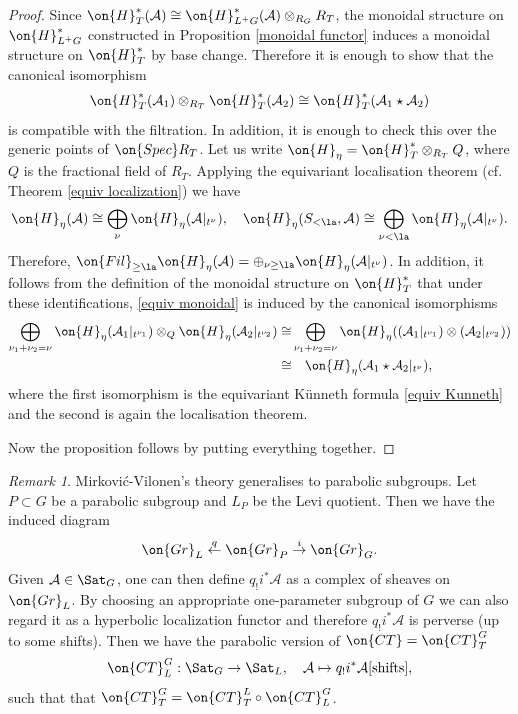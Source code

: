 \documentclass[]{pcmi}
\theoremstyle{plain}
\theoremstyle{remark}
\newtheorem{rmk}[equation]{Remark}
\theoremstyle{definition}
\newcommand{\mA}{{\mathcal A}}
\newcommand{\Gr}{{\on{Gr}}}
\newcommand{\Spec}{\on{Spec}}
\begin{document}
\begin{proof}
Since $\on{H}_{T}^*(\mA)\cong \on{H}^*_{L^+G}(\mA)\otimes_{R_{G}}R_{T}$, the monoidal structure on $\on{H}_{L^+G}^*$ constructed in Proposition \ref{monoidal functor} induces a monoidal structure on $\on{H}_{T}^*$ by base change. Therefore it is enough to show that the canonical isomorphism
\begin{equation}\label{equiv monoidal}
\on{H}^*_{T}(\mA_1)\otimes_{R_{T}}\on{H}^*_{T}(\mA_2)\cong \on{H}^*_{T}(\mA_1\star\mA_2)
\end{equation}
is compatible with the filtration. In addition, it is enough to check this over the generic points of $\Spec R_{T}$. Let  us write $\on{H}_\eta=\on{H}^*_{T}\otimes_{R_{T}}Q$, where $Q$ is the fractional field of $R_{T}$.
Applying the equivariant localisation theorem (cf. Theorem \ref{equiv localization}) we have
\[\on{H}_\eta(\mA)\cong \bigoplus_\nu \on{H}_\eta(\mA|_{t^\nu}),\quad \on{H}_\eta(S_{<\la},\mA)\cong\bigoplus_{\nu<\la}\on{H}_\eta(\mA|_{t^\nu}).\]
Therefore, $\on{Fil}_{\geq \la}\on{H}_\eta(\mA)=\oplus_{\nu\geq \la}\on{H}_\eta(\mA|_{t^\nu})$.
In addition, it follows from the definition of the monoidal structure on $\on{H}^*_{T}$ that under these identifications, \eqref{equiv monoidal} is induced by the canonical isomorphisms
\[\begin{split}\bigoplus_{\nu_1+\nu_2=\nu} \on{H}_\eta(\mA_1|_{t^{\nu_1}})\otimes_Q \on{H}_\eta(\mA_2|_{t^{\nu_2}})\cong &\bigoplus_{\nu_1+\nu_2=\nu}\on{H}_\eta((\mA_1|_{t^{\nu_1}})\otimes (\mA_2|_{t^{\nu_2}})) \\
\cong &\quad \on{H}_\eta(\mA_1\star\mA_2|_{t^\nu}),
\end{split}\]
where the first isomorphism is the equivariant K\"unneth formula \eqref{equiv Kunneth} and the second is again the localisation theorem. 

Now the proposition follows by putting everything together.
\end{proof}


\begin{rmk}\label{Parabolic MV}
Mirkovi\'c-Vilonen's theory generalises to parabolic subgroups. Let $P\subset G$ be a parabolic subgroup and $L_P$ be the Levi quotient. Then we have the induced diagram
\[\Gr_L\stackrel{q}{\leftarrow}\Gr_P\stackrel{i}{\to}\Gr_G.\]
Given $\mA\in\Sat_G$, one can then define $q_!i^*\mA$ as a complex of sheaves on $\Gr_L$. By choosing an appropriate one-parameter subgroup of $G$ we can also regard it as a hyperbolic localization functor and therefore $q_!i^*\mA$ is perverse (up to some shifts). Then we have the parabolic version of $\on{CT}=\on{CT}^G_T$
\[\on{CT}^G_L: \Sat_G\to \Sat_L,\quad \mA\mapsto q_!i^*\mA[\mbox{shifts}],\]
such that that $\on{CT}^G_T=\on{CT}^L_T\circ\on{CT}^G_L$. 
\end{rmk}
\end{document}
